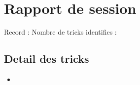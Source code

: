 
\newpage
\section{Rapport de session}

Record : 
Nombre de tricks identifies : 

\subsection{Detail des tricks}
\begin{itemize}[leftmargin=0cm]
  \vspace*{0.4cm}
  \item {}
\end{itemize}


